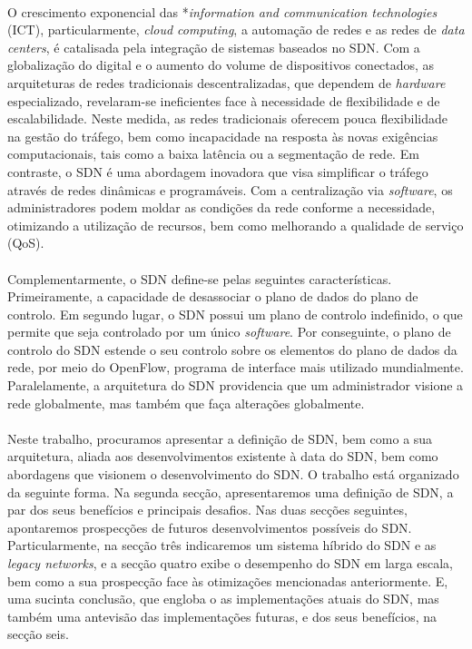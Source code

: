 \documentclass{llncs}
\begin{document}
\paragraph{} O crescimento exponencial das *\textit {information and communication technologies} (ICT), particularmente, \textit {cloud computing}, a automação de redes e as redes de \textit {data centers}, é catalisada pela integração de sistemas baseados no SDN. \cite{paper1}
 Com a globalização do digital e o aumento do volume de dispositivos conectados, as arquiteturas de redes tradicionais descentralizadas, que dependem de \textit {hardware} especializado, revelaram-se ineficientes face à necessidade de flexibilidade e de escalabilidade. 
 Neste medida, as redes tradicionais oferecem pouca flexibilidade na gestão do tráfego, bem como incapacidade na resposta às novas exigências computacionais, tais como a baixa latência ou a segmentação de rede. 
 Em contraste, o SDN é uma abordagem inovadora que visa simplificar o tráfego através de redes dinâmicas e programáveis. 
 Com a centralização via \textit {software}, os administradores podem moldar as condições da rede conforme a necessidade, otimizando a utilização de recursos, bem como melhorando a qualidade de serviço (QoS).
 \paragraph{}
Complementarmente, o SDN define-se pelas seguintes características. Primeiramente, a capacidade de desassociar o plano de dados do plano de controlo. \cite{paper3}
 Em segundo lugar, o SDN possui um plano de controlo indefinido, o que permite que seja controlado por um único \textit {software}.
 Por conseguinte, o plano de controlo do SDN estende o seu controlo sobre os elementos do plano de dados da rede, por meio do OpenFlow, programa de interface mais utilizado mundialmente.
 Paralelamente, a arquitetura do SDN providencia que um administrador visione a rede globalmente, mas também que faça alterações globalmente.
 \paragraph{}
Neste trabalho, procuramos apresentar a definição de SDN, bem como a sua arquitetura, aliada aos desenvolvimentos existente à data do SDN, bem como abordagens que visionem o desenvolvimento do SDN.
 O trabalho está organizado da seguinte forma. Na segunda secção, apresentaremos uma definição de SDN, a par dos seus benefícios  e principais desafios.
 Nas duas secções seguintes, apontaremos prospecções de futuros desenvolvimentos possíveis do SDN. 
 Particularmente, na secção três indicaremos um sistema híbrido do SDN e as \textit {legacy networks}, e a secção quatro exibe o desempenho do SDN em larga escala, bem como a sua prospecção face às otimizações mencionadas anteriormente. 
 E, uma sucinta conclusão, que engloba o as implementações atuais do SDN, mas também uma antevisão das implementações futuras, e dos seus benefícios, na secção seis.
\end{document}
